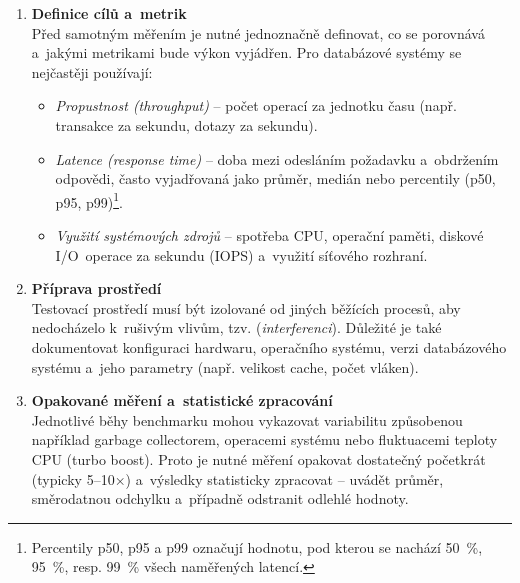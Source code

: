 \begin{enumerate}
    \item \textbf{Definice cílů a~metrik} \\
    Před samotným měřením je nutné jednoznačně definovat, co se porovnává a~jakými metrikami bude výkon vyjádřen. 
    Pro databázové systémy se nejčastěji používají:
    \begin{itemize}
        \item \textit{Propustnost (throughput)} -- počet operací za jednotku času (např. transakce za sekundu, dotazy za sekundu).
        \item \textit{Latence (response time)} -- doba mezi odesláním požadavku a~obdržením odpovědi, často vyjadřovaná jako průměr, medián nebo percentily (p50, p95, p99)\footnote{Percentily p50, p95 a p99 označují hodnotu, pod kterou se nachází 50~\%, 95~\%, resp. 99~\% všech naměřených latencí.}.
        \item \textit{Využití systémových zdrojů} -- spotřeba CPU, operační paměti, diskové I/O~operace za sekundu (IOPS) a~využití síťového rozhraní.
    \end{itemize}

    \item \textbf{Příprava prostředí} \\
    Testovací prostředí musí být izolované od jiných běžících procesů, aby nedocházelo k~rušivým vlivům, tzv. (\textit{interferenci}). 
    Důležité je také dokumentovat konfiguraci hardwaru, operačního systému, verzi databázového systému a~jeho parametry (např. velikost cache, počet vláken).
    \cite{jain1991art}

    \item \textbf{Opakované měření a~statistické zpracování} \\
    Jednotlivé běhy benchmarku mohou vykazovat variabilitu způsobenou například garbage collectorem, operacemi systému nebo fluktuacemi teploty CPU (turbo boost). 
    Proto je nutné měření opakovat dostatečný početkrát (typicky 5--10×) a~výsledky statisticky zpracovat -- uvádět průměr, směrodatnou odchylku a~případně odstranit odlehlé hodnoty. 
    \cite{jain1991art}
\end{enumerate}

